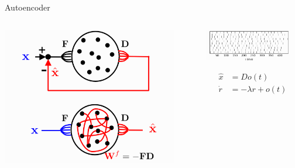 \documentclass[17pt, t, lualatex]{beamer}
\begin{document}
\begin{frame}{Autoencoder}
	\begin{columns}[T]
		\begin{column}{0.48\textwidth}
			\begin{center}
				\includegraphics[width=0.9\textwidth,trim= 3cm 5cm 3cm 6cm]{figures/autoencoder.png}
			\end{center}
		\end{column}

		\begin{column}{0.48\textwidth}
			\begin{center}
				\includegraphics[width=0.9\textwidth]{figures/spikeplot.png}
			\end{center}
			\begin{equation}
				\begin{aligned}
					\hat{x} &= Do(t)\\
					\dot{r} &= -\lambda r + o(t)
				\end{aligned}
			\end{equation}
		\end{column}
	\end{columns}

\end{frame}
\end{document}
